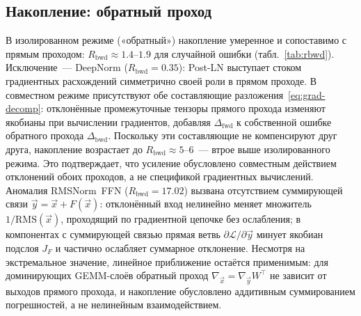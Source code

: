 \subsection{Накопление: обратный проход}

В изолированном режиме («обратный») накопление умеренное и сопоставимо с прямым
проходом: $R_{\text{bwd}}\approx1.4$--$1.9$ для случайной ошибки
(табл.~\ref{tab:rbwd}). Исключение~--- DeepNorm ($R_{\text{bwd}}=0.35$): Post-LN
выступает стоком градиентных расхождений симметрично своей роли в прямом проходе.
В совместном режиме присутствуют обе составляющие
разложения~\eqref{eq:grad-decomp}: отклонённые промежуточные тензоры прямого
прохода изменяют якобианы при вычислении градиентов, добавляя
$\Delta_{\text{fwd}}$ к собственной ошибке обратного прохода
$\Delta_{\text{bwd}}$. Поскольку эти составляющие не компенсируют друг друга,
накопление возрастает до $R_{\text{bwd}}\approx5$--$6$~--- втрое выше
изолированного режима. Это подтверждает, что усиление обусловлено совместным
действием отклонений обоих проходов, а не спецификой градиентных вычислений.
Аномалия RMSNorm~FFN ($R_{\text{bwd}}=17.02$) вызвана отсутствием суммирующей
связи $\Vec{y}=\Vec{x}+F(\Vec{x})$: отклонённый вход нелинейно меняет множитель
$1/\mathrm{RMS}(\Vec{x})$, проходящий по градиентной цепочке без ослабления;
в компонентах с суммирующей связью прямая ветвь $\partial\mathcal{L}/\partial\Vec{y}$
минует якобиан подслоя $J_F$ и частично ослабляет суммарное отклонение. Несмотря
на экстремальное значение, линейное приближение остаётся применимым: для
доминирующих GEMM-слоёв обратный проход $\nabla_{\Vec{x}}=\nabla_{\Vec{y}}W^\top$
не зависит от выходов прямого прохода, и накопление обусловлено аддитивным
суммированием погрешностей, а не нелинейным взаимодействием.

\begin{table}[htbp]
    \centering
    \caption{Коэффициент накопления $R_{\text{bwd}}$ по двум режимам
        (\texttt{cpu\_vs\_xla}).}
    \label{tab:rbwd}
\end{table}

